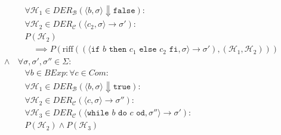 \begin{align*}
						                  & \quad \forall \mathcal{H} _ 1 \in \textit{DER} _ \mathcal{B} (\langle b, \sigma \rangle \Downarrow \texttt{false}) :                                                                                                       \\
						                  & \quad \forall \mathcal{H} _ 2 \in \textit{DER} _ \mathcal{C} (\langle c _ 2, \sigma \rangle \rightarrow \sigma') :                                                                                                         \\
						                  & \quad P(\mathcal{H} _ 2)                                                                                                                                                                                                   \\
						                  & \quad\quad \implies P(\text{riff}((\langle \texttt{if } b \texttt{ then } c _ 1 \texttt{ else } c _ 2 \texttt{ fi}, \sigma \rangle \rightarrow \sigma'), (\mathcal{H} _ 1, \mathcal{H} _ 2)))                              \\
						\land             & \,\forall \sigma, \sigma', \sigma'' \in \Sigma :                                                                                                                                                                           \\
						                  & \quad \forall b \in \textit{BExp} : \forall c \in \textit{Com} :                                                                                                                                                           \\
						                  & \quad \forall \mathcal{H} _ 1 \in \textit{DER} _ \mathcal{B} (\langle b, \sigma \rangle \Downarrow \texttt{true}) :                                                                                                        \\
						                  & \quad \forall \mathcal{H} _ 2 \in \textit{DER} _ \mathcal{C} (\langle c, \sigma \rangle \rightarrow \sigma'') :                                                                                                            \\
						                  & \quad \forall \mathcal{H} _ 3 \in \textit{DER} _ \mathcal{C} (\langle \texttt{while } b \texttt{ do } c \texttt{ od}, \sigma'' \rangle \rightarrow \sigma') :                                                              \\
						                  & \quad P(\mathcal{H} _ 2) \land P(\mathcal{H} _ 3)                                                                                                                                                                          \\

\end{align*}
